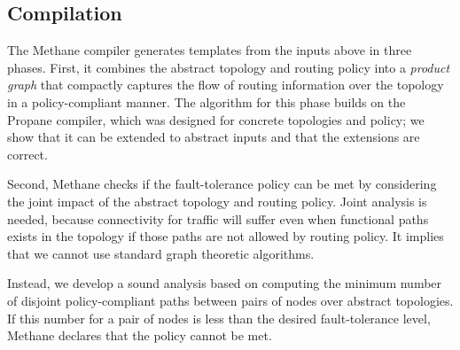 \documentclass[numbers, 10pt, preprint]{sigplanconf}
\newcommand{\sysname}{{\small \sf Methane}\xspace}
\begin{document}
\subsection{Compilation}


The \sysname compiler generates templates from the inputs above in three phases. First, it combines the abstract topology and routing policy into a {\em product graph} that compactly captures the flow of routing information over the topology in a policy-compliant manner. The algorithm for this phase builds on the Propane compiler, which was designed for concrete topologies and policy; we show that it can be extended to abstract inputs and that the extensions are correct.

Second, \sysname checks if the fault-tolerance policy can be met by considering the joint impact of the abstract topology and routing policy. Joint analysis is needed, because connectivity for traffic will suffer even when functional paths exists in the topology if those paths are not allowed by routing policy. It implies that we cannot use standard graph theoretic algorithms.

Instead, we develop a sound analysis based on computing the minimum number of disjoint policy-compliant paths between pairs of nodes over abstract topologies. If this number for a pair of nodes is less than the desired fault-tolerance level, \sysname declares that the policy cannot be met.
\end{document}
